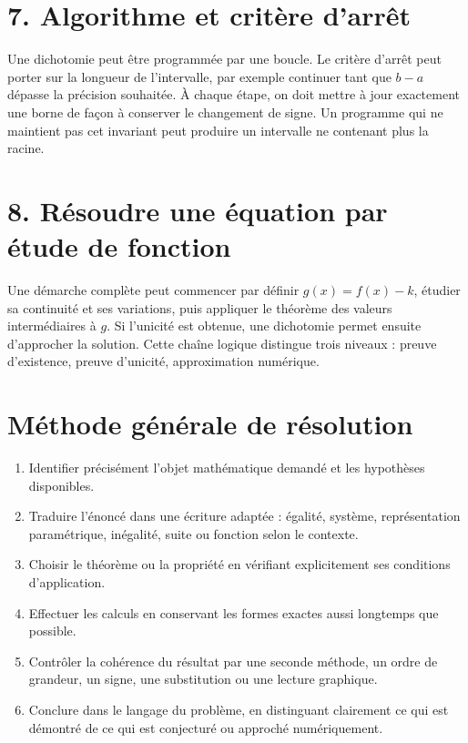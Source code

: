 \section{7. Algorithme et critère d’arrêt}
Une dichotomie peut être programmée par une boucle. Le critère d'arrêt peut porter sur la longueur de l'intervalle, par exemple continuer tant que $b-a$ dépasse la précision souhaitée. À chaque étape, on doit mettre à jour exactement une borne de façon à conserver le changement de signe. Un programme qui ne maintient pas cet invariant peut produire un intervalle ne contenant plus la racine.

\section{8. Résoudre une équation par étude de fonction}
Une démarche complète peut commencer par définir $g(x)=f(x)-k$, étudier sa continuité et ses variations, puis appliquer le théorème des valeurs intermédiaires à $g$. Si l'unicité est obtenue, une dichotomie permet ensuite d'approcher la solution. Cette chaîne logique distingue trois niveaux : preuve d'existence, preuve d'unicité, approximation numérique.


\section{Méthode générale de résolution}
\begin{methode}
\begin{enumerate}
\item Identifier précisément l'objet mathématique demandé et les hypothèses disponibles.
\item Traduire l'énoncé dans une écriture adaptée : égalité, système, représentation paramétrique, inégalité, suite ou fonction selon le contexte.
\item Choisir le théorème ou la propriété en vérifiant explicitement ses conditions d'application.
\item Effectuer les calculs en conservant les formes exactes aussi longtemps que possible.
\item Contrôler la cohérence du résultat par une seconde méthode, un ordre de grandeur, un signe, une substitution ou une lecture graphique.
\item Conclure dans le langage du problème, en distinguant clairement ce qui est démontré de ce qui est conjecturé ou approché numériquement.
\end{enumerate}
\end{methode}

